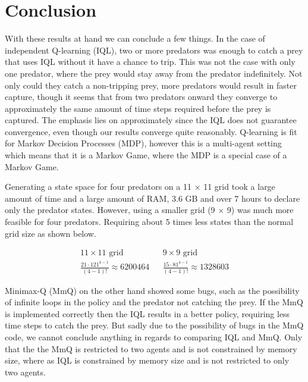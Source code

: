 \section{Conclusion}
With these results at hand we can conclude a few things. In the case of independent Q-learning (IQL), two or more predators was enough to catch a prey that uses IQL without it have a chance to trip. This was not the case with only one predator, where the prey would stay away from the predator indefinitely. 
Not only could they catch a non-tripping prey, more predators would result in faster capture, though it seems that from two predators onward they converge to approximately the same amount of time steps required before the prey is captured. The emphasis lies on approximately since the IQL does not guarantee convergence, even though our results converge quite reasonably. Q-learning is fit for Markov Decision Processes (MDP), however this is a multi-agent setting which means that it is a Markov Game, where the MDP is a special case of a Markov Game.

Generating a state space for four predators on a 11 $\times$ 11 grid took a large amount of time and a large amount of RAM, 3.6 GB and over 7 hours to declare only the predator states. However, using a smaller grid (9 $\times$ 9) was much more feasible for four predators. Requiring about 5 times less states than the normal grid size as shown below.

\begin{align*}
11 \times 11 \text{ grid} & & 9 \times 9 \text{ grid}\\
\frac{21\cdot 121^{4-1}}{(4-1)!} \approx 6200464 & & \frac{15\cdot 81^{4-1}}{(4-1)!} \approx 1328603
\end{align*}

Minimax-Q (MmQ) on the other hand showed some bugs, such as the possibility of infinite loops in the policy and the predator not catching the prey. If the MmQ is implemented correctly then the IQL results in a better policy, requiring less time steps to catch the prey. But sadly due to the possibility of bugs in the MmQ code, we cannot conclude anything in regards to comparing IQL and MmQ. Only that the the MmQ is restricted to two agents and is not constrained by memory size, where as IQL is constrained by memory size and is not restricted to only two agents.
